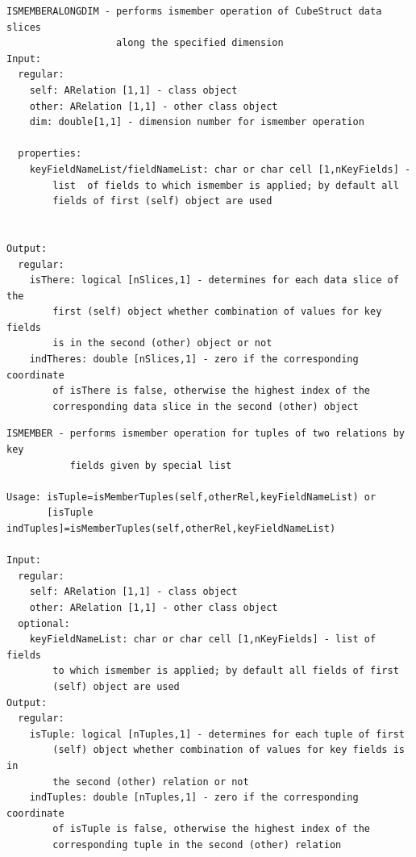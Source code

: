 \documentclass[letterpaper,10pt,english]{sphinxmanual}
\begin{document}
\label{chap_func:smartdb-relations-atypifiedstaticrelation-ismemberalongdim}
\begin{Verbatim}[commandchars=\\\{\}]
ISMEMBERALONGDIM - performs ismember operation of CubeStruct data slices
                   along the specified dimension
Input:
  regular:
    self: ARelation [1,1] - class object
    other: ARelation [1,1] - other class object
    dim: double[1,1] - dimension number for ismember operation

  properties:
    keyFieldNameList/fieldNameList: char or char cell [1,nKeyFields] -
        list  of fields to which ismember is applied; by default all
        fields of first (self) object are used


Output:
  regular:
    isThere: logical [nSlices,1] - determines for each data slice of the
        first (self) object whether combination of values for key fields
        is in the second (other) object or not
    indTheres: double [nSlices,1] - zero if the corresponding coordinate
        of isThere is false, otherwise the highest index of the
        corresponding data slice in the second (other) object
\end{Verbatim}
\label{chap_func:smartdb-relations-atypifiedstaticrelation-ismember}
\begin{Verbatim}[commandchars=\\\{\}]
ISMEMBER - performs ismember operation for tuples of two relations by key
           fields given by special list

Usage: isTuple=isMemberTuples(self,otherRel,keyFieldNameList) or
       [isTuple indTuples]=isMemberTuples(self,otherRel,keyFieldNameList)

Input:
  regular:
    self: ARelation [1,1] - class object
    other: ARelation [1,1] - other class object
  optional:
    keyFieldNameList: char or char cell [1,nKeyFields] - list of fields
        to which ismember is applied; by default all fields of first
        (self) object are used
Output:
  regular:
    isTuple: logical [nTuples,1] - determines for each tuple of first
        (self) object whether combination of values for key fields is in
        the second (other) relation or not
    indTuples: double [nTuples,1] - zero if the corresponding coordinate
        of isTuple is false, otherwise the highest index of the
        corresponding tuple in the second (other) relation
\end{Verbatim}
\label{chap_func:smartdb-relations-atypifiedstaticrelation-isuniquekey}
\end{document}
